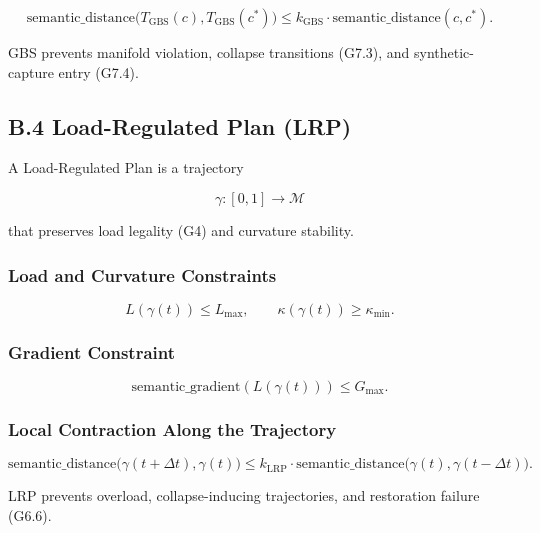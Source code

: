 \[
\text{semantic\_distance}\big(T_{\mathrm{GBS}}(c), T_{\mathrm{GBS}}(c^*)\big)
\le k_{\mathrm{GBS}} \cdot \text{semantic\_distance}(c, c^*).
\]



\noindent GBS prevents manifold violation, collapse transitions (G7.3), and
synthetic-capture entry (G7.4).


\subsection*{B.4 Load-Regulated Plan (LRP)}

\noindent A Load-Regulated Plan is a trajectory



\[
\gamma : [0,1] \rightarrow \mathcal{M}
\]



that preserves load legality (G4) and curvature stability.

\subsubsection*{Load and Curvature Constraints}



\[
L(\gamma(t)) \le L_{\max},
\qquad
\kappa(\gamma(t)) \ge \kappa_{\min}.
\]



\subsubsection*{Gradient Constraint}



\[
\text{semantic\_gradient}(L(\gamma(t))) \le G_{\max}.
\]



\subsubsection*{Local Contraction Along the Trajectory}



\[
\text{semantic\_distance}\big(\gamma(t+\Delta t), \gamma(t)\big)
\le k_{\mathrm{LRP}} \cdot
\text{semantic\_distance}\big(\gamma(t), \gamma(t-\Delta t)\big).
\]



\noindent LRP prevents overload, collapse-inducing trajectories, and restoration
failure (G6.6).

